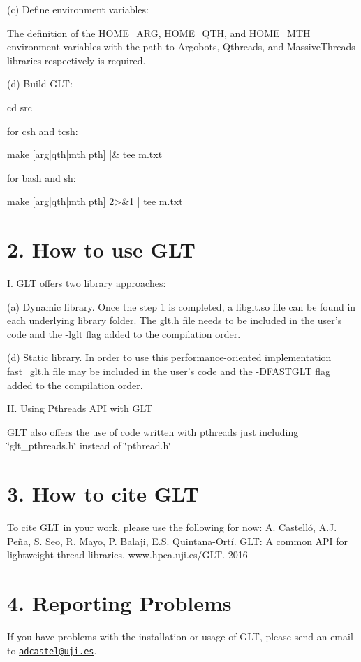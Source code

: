 (c) Define environment variables\-: \begin{DoxyVerb}The definition of the HOME_ARG, HOME_QTH, and HOME_MTH environment 
variables with the path to Argobots, Qthreads, and MassiveThreads 
libraries respectively is required.
\end{DoxyVerb}


(d) Build G\-L\-T\-: \begin{DoxyVerb}cd src

for csh and tcsh:

  make [arg|qth|mth|pth] |& tee m.txt

for bash and sh:

  make [arg|qth|mth|pth] 2>&1 | tee m.txt
\end{DoxyVerb}






\section*{2. How to use G\-L\-T }

I. G\-L\-T offers two library approaches\-:

(a) Dynamic library. Once the step 1 is completed, a libglt.\-so file can be found in each underlying library folder. The glt.\-h file needs to be included in the user's code and the -\/lglt flag added to the compilation order.

(d) Static library. In order to use this performance-\/oriented implementation fast\-\_\-glt.\-h file may be included in the user's code and the -\/\-D\-F\-A\-S\-T\-G\-L\-T flag added to the compilation order.

I\-I. Using Pthreads A\-P\-I with G\-L\-T

G\-L\-T also offers the use of code written with pthreads just including \char`\"{}glt\-\_\-pthreads.\-h\char`\"{} instead of \char`\"{}pthread.\-h\char`\"{}





\section*{3. How to cite G\-L\-T }

To cite G\-L\-T in your work, please use the following for now\-: A. Castelló, A.\-J. Peña, S. Seo, R. Mayo, P. Balaji, E.\-S. Quintana-\/\-Ortí. G\-L\-T\-: A common A\-P\-I for lightweight thread libraries. www.\-hpca.\-uji.\-es/\-G\-L\-T. 2016 



\section*{4. Reporting Problems }

If you have problems with the installation or usage of G\-L\-T, please send an email to \href{mailto:adcastel@uji.es}{\tt adcastel@uji.\-es}. 